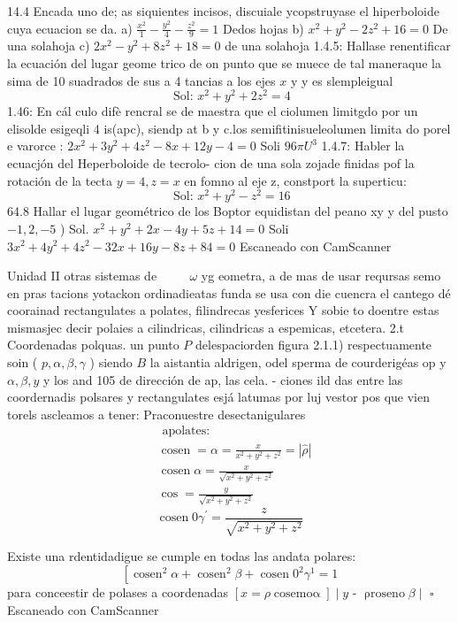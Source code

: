 

14.4 Encada uno de; as siquientes incisos, discuiale ycopstruyase el hiperboloide cuya ecuacion se da.
a) $\frac{x^2}{1}-\frac{y^2}{4}-\frac{z^2}{9}=1$ Dedos hojas
b) $x^2+y^2-2 z^2+16=0$ De una solahoja
c) $2 x^2-y^2+8 z^2+18=0$ de una solahoja
1.4.5: Hallase renentificar la ecuación del lugar geome trico de on punto que se muece de tal maneraque la sima de 10 suadrados de sus a 4 tancias a los ejes $x$ y y es slempleigual
$$
\text { Sol: } x^2+y^2+2 z^2=4
$$
1.46: En cál culo difè rencral se de maestra que el ciolumen limitgdo por un elisolde esigeqli 4 is(apc), siendp at b y c.los semifitinisueleolumen limita do porel e varorce :
$2 x^2+3 y^2+4 z^2-8 x+12 y-4=0$
Soli $96 \pi U^3$
1.4.7: Habler la ecuacjón del Heperboloide de tecrolo- cion de una sola zojade finidas pof la rotación de la tecta $y=4, z=x$ en fomno al eje z, constport la superticu:
$$
\text { Sol: } x^2+y^2-z^2=16
$$
64.8 Hallar el lugar geométrico de los Boptor equidistan del peano xy y del pusto $-1,2,-5$ ) Sol. $x^2+y^2+2 x-4 y+5 z+14=0$ Soli $3 x^2+4 y^2+4 z^2-32 x+16 y-8 z+84=0$
Escaneado con CamScanner




Unidad
II otras sistemas
de $\qquad$
$\omega$ yg eometra, a de mas de usar reqursas semo en pras tacions yotackon ordinadieatas funda se usa con die cuencra el cantego dé coorainad rectangulates a polates, filindrecas yesferices Y sobie to doentre estas mismasjec decir polaies a cilindricas, cilindricas a espemicas, etcetera.
2.t Coordenadas polquas. un punto $P$ delespaciorden figura 2.1.1) respectuamente soin ( $p, \alpha, \beta, \gamma$ ) siendo $B$ la aistantia aldrigen, odel sperma de courderigéas op y $\alpha, \beta, y$ y los and 105 de dirección de ap, las cela. - ciones ild das entre las coordernadis polsares y rectangulates esjá latumas por luj vestor pos que vien torels ascleamos a tener:
Praconuestre desectanigulares
$$
\begin{aligned}
	& \text { apolates: } \\
	& \operatorname{cosen}=\alpha=\frac{x}{x^2+y^2+z^2}=|\hat{\rho}| \\
	& \operatorname{cosen} \alpha=\frac{x}{\sqrt{x^2+y^2+z^2}} \\
	& \cos =\frac{y}{\sqrt{x^2+y^2+z^2}}
\end{aligned}
$$
$$
\operatorname{cosen} 0 \gamma^{\prime}=\frac{z}{\sqrt{x^2+y^2+z^2}}
$$

Existe una rdentidadigue se cumple en todas las andata polares:
$$
\left[\operatorname{cosen}^2 \alpha+\operatorname{cosen}^2 \beta+\operatorname{cosen} 0^2 \gamma^1=1\right.
$$
para conceestir de polases a coordenadas
$[x=\rho \operatorname{cosemo\alpha }] \mid y$ - $\operatorname{\rho roseno} \beta \mid$ $\square$
Escaneado con CamScanner


